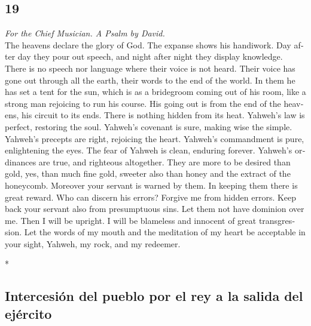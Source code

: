 \begin{paracol}{2}
\switchcolumn
\begin{otherlanguage}{english}

\hypertarget{section-37}{%
\section{19}\label{section-37}}

\emph{For the Chief Musician. A Psalm by David.}\\
 The heavens declare the glory of God. The expanse shows
his handiwork.  Day after day they pour out speech, and
night after night they display knowledge.  There is no
speech nor language where their voice is not heard.  Their
voice has gone out through all the earth, their words to the end of the
world. In them he has set a tent for the sun,  which is as
a bridegroom coming out of his room, like a strong man rejoicing to run
his course.  His going out is from the end of the heavens,
his circuit to its ends. There is nothing hidden from its heat.
 Yahweh's law is perfect, restoring the soul. Yahweh's
covenant is sure, making wise the simple.  Yahweh's
precepts are right, rejoicing the heart. Yahweh's commandment is pure,
enlightening the eyes.  The fear of Yahweh is clean,
enduring forever. Yahweh's ordinances are true, and righteous
altogether.  They are more to be desired than gold, yes,
than much fine gold, sweeter also than honey and the extract of the
honeycomb.  Moreover your servant is warned by them. In
keeping them there is great reward.  Who can discern his
errors? Forgive me from hidden errors.  Keep back your
servant also from presumptuous sins. Let them not have dominion over me.
Then I will be upright. I will be blameless and innocent of great
transgression.  Let the words of my mouth and the
meditation of my heart be acceptable in your sight, Yahweh, my rock, and
my redeemer.

\end{otherlanguage}

\switchcolumn[0]*

\hypertarget{intercesiuxf3n-del-pueblo-por-el-rey-a-la-salida-del-ejuxe9rcito}{%
\subsection{Intercesión del pueblo por el rey a la salida del
ejército}\label{intercesiuxf3n-del-pueblo-por-el-rey-a-la-salida-del-ejuxe9rcito}}


\end{paracol}
